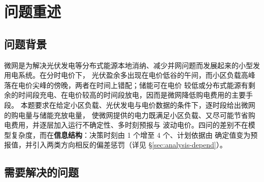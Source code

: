 
\section{问题重述}\label{chap:restate}

\subsection{问题背景}

微网是为解决光伏发电等分布式能源本地消纳、减少并网问题而发展起来的小型发用电系统。在分时电价下，
光伏盈余多出现在电价低谷的午间，而小区负载高峰落在电价尖峰的傍晚，两者在时间上错配；储能可在电价
较低或分布式能源有剩余的时间段充电、在电价较高的时间段放电，因而是微网降低购电费用的主要手段。
本题要求在给定小区负载、光伏发电与电价数据的条件下，逐时段给出微网的购电量与储能充放电量，
使微网提供的电力既满足小区负载、又尽可能节省购电费用，并逐层加入运行不确定性、多时刻预报与
波动电价。四问的差别不在模型复杂度，而在\textbf{信息结构}：决策时刻由 1 个增至 4 个、计划依据由
确定值变为预报值，并引入两类方向相反的偏差惩罚（详见 \S\ref{sec:analysis-depend}）。

\subsection{需要解决的问题}

